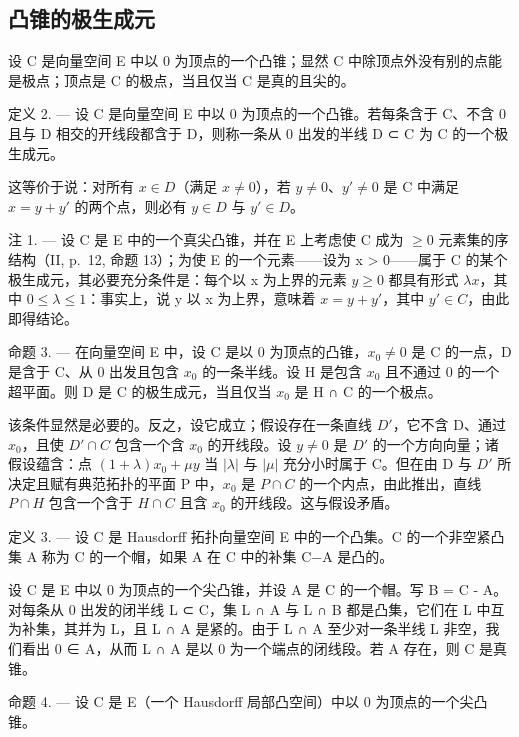 \subsection{凸锥的极生成元}

设 C 是向量空间 E 中以 0 为顶点的一个凸锥；显然 C 中除顶点外没有别的点能是极点；顶点是 C 的极点，当且仅当 C 是真的且尖的。

定义 2. --- 设 C 是向量空间 E 中以 0 为顶点的一个凸锥。若每条含于 C、不含 0 且与 D 相交的开线段都含于 D，则称一条从 0 出发的半线 D ⊂ C 为 C 的一个极生成元。

这等价于说：对所有 \(x \in D\)（满足 \(x \neq 0\)），若 \(y \neq 0\)、\(y' \neq 0\) 是 C 中满足 \(x = y + y'\) 的两个点，则必有 \(y \in D\) 与 \(y' \in D\)。

注 1. --- 设 C 是 E 中的一个真尖凸锥，并在 E 上考虑使 C 成为 \(\geqslant 0\) 元素集的序结构（II, p.~12, 命题 13）；为使 E 的一个元素——设为 x \textgreater{} 0——属于 C 的某个极生成元，其必要充分条件是：每个以 x 为上界的元素 \(y \geqslant 0\) 都具有形式 \(\lambda x\)，其中 \(0 \leqslant \lambda \leqslant 1\)：事实上，说 y 以 x 为上界，意味着 \(x = y + y'\)，其中 \(y' \in C\)，由此即得结论。

命题 3. --- 在向量空间 E 中，设 C 是以 0 为顶点的凸锥，\(x_{0} \neq 0\) 是 C 的一点，D 是含于 C、从 0 出发且包含 \(x_{0}\) 的一条半线。设 H 是包含 \(x_{0}\) 且不通过 0 的一个超平面。则 D 是 C 的极生成元，当且仅当 \(x_{0}\) 是 H ∩ C 的一个极点。

该条件显然是必要的。反之，设它成立；假设存在一条直线 \(D'\)，它不含 D、通过 \(x_{0}\)，且使 \(D' \cap C\) 包含一个含 \(x_{0}\) 的开线段。设 \(y \neq 0\) 是 \(D'\) 的一个方向向量；诸假设蕴含：点 \((1 + \lambda)x_{0} + \mu y\) 当 \(|\lambda|\) 与 \(|\mu|\) 充分小时属于 C。但在由 D 与 \(D'\) 所决定且赋有典范拓扑的平面 P 中，\(x_{0}\) 是 \(P \cap C\) 的一个内点，由此推出，直线 \(P \cap H\) 包含一个含于 \(H \cap C\) 且含 \(x_{0}\) 的开线段。这与假设矛盾。

定义 3. --- 设 C 是 Hausdorff 拓扑向量空间 E 中的一个凸集。C 的一个非空紧凸集 A 称为 C 的一个帽，如果 A 在 C 中的补集 C−A 是凸的。

设 C 是 E 中以 0 为顶点的一个尖凸锥，并设 A 是 C 的一个帽。写 B = C - A。对每条从 0 出发的闭半线 L ⊂ C，集 L ∩ A 与 L ∩ B 都是凸集，它们在 L 中互为补集，其并为 L，且 L ∩ A 是紧的。由于 L ∩ A 至少对一条半线 L 非空，我们看出 0 ∈ A，从而 L ∩ A 是以 0 为一个端点的闭线段。若 A 存在，则 C 是真锥。

命题 4. --- 设 C 是 E（一个 Hausdorff 局部凸空间）中以 0 为顶点的一个尖凸锥。

